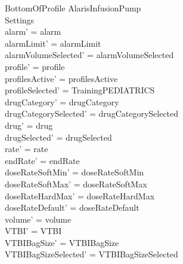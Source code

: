 \begin{schema}{BottomOfProfile}
	\Delta AlarisInfusionPump\\
	 Settings\\
	\where
	alarm' = alarm\\
	alarmLimit' = alarmLimit\\
	\pagebreak 
	alarmVolumeSelected' = alarmVolumeSelected\\
	profile' = profile\\
	profilesActive' = profilesActive\\    
	profileSelected' = TrainingPEDIATRICS\\
	drugCategory' = drugCategory\\ drugCategorySelected' = drugCategorySelected\\
	drug' = drug\\ drugSelected' = drugSelected\\
	rate' = rate\\
	endRate' = endRate\\
	doseRateSoftMin' = doseRateSoftMin\\
	doseRateSoftMax' = doseRateSoftMax\\
	doseRateHardMax' = doseRateHardMax\\
	doseRateDefault' = doseRateDefault\\
	volume' = volume\\
	VTBI' = VTBI\\
	VTBIBagSize' = VTBIBagSize\\ VTBIBagSizeSelected' = VTBIBagSizeSelected\\

\end{schema}
